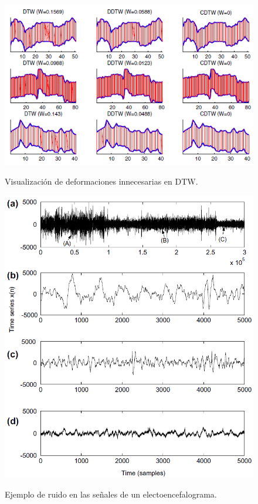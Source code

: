 \begin{figure}[h]
\vspace{0.1in}
\begin{center}
\includegraphics[scale=1]{cdtw.png}\\
\end{center}
\caption{Visualizaci\'on de deformaciones innecesarias en DTW.}
\label{arm:fig6}
\end{figure}
\begin{figure}[h]
\vspace{0.1in}
\begin{center}
\includegraphics[scale=0.6]{brainsignal.png}\\
\end{center}
\caption{Ejemplo de ruido en las se\~nales de un electoencefalograma.}
\label{arm:fig7}
\end{figure}